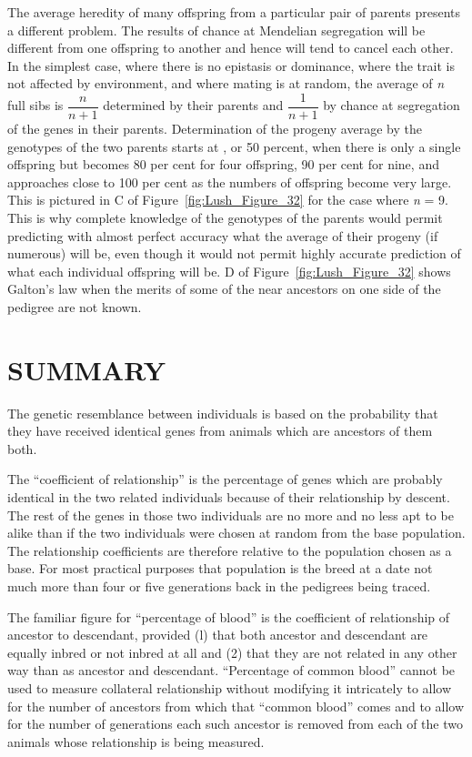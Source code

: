{
The average heredity of many offspring from a particular pair of
parents presents a different problem. The results of chance at Mendelian
segregation will be different from one offspring to another and
hence will tend to cancel each other. In the simplest case, where there
is no epistasis or dominance, where the trait is not affected by environment,
and where mating is at random, the average of \textit{n} full sibs is
$\dfrac{n}{n + 1}$ determined by their parents and $\dfrac{1}{n + 1}$ by chance at
segregation of the genes in their parents. Determination of the progeny average
by the genotypes of the two parents starts at , or 50 percent, when
there is only a single offspring but becomes 80 per cent for four offspring,
90 per cent for nine, and approaches close to 100 per cent as the
numbers of offspring become very large. This is pictured in C of
Figure~\ref{fig:Lush_Figure_32} for the case where \textit{n} = 9. This is why complete knowledge of 
the genotypes of the parents would permit predicting with almost perfect
accuracy what the average of their progeny (if numerous) will be, even
though it would not permit highly accurate prediction of what each
individual offspring will be. D of Figure~\ref{fig:Lush_Figure_32} shows Galton's law when
the merits of some of the near ancestors on one side of the pedigree are
not known.

\section*{SUMMARY}

The genetic resemblance between individuals is based on the probability
that they have received identical genes from animals which are
ancestors of them both.

The ``coefficient of relationship''	 is the percentage of genes which
are probably identical in the two related individuals because of their
relationship by descent. The rest of the genes in those two individuals
are no more and no less apt to be alike than if the two individuals were
chosen at random from the base population. The relationship coefficients
are therefore relative to the population chosen as a base. For most
practical purposes that population is the breed at a date not much
more than four or five generations back in the pedigrees being traced.

The familiar figure for ``percentage of blood'' is the coefficient of
relationship of ancestor to descendant, provided (l) that both ancestor
and descendant are equally inbred or not inbred at all and (2) that they
are not related in any other way than as ancestor and descendant. ``Percentage
of common blood'' cannot be used to measure collateral relationship
without modifying it intricately to allow for the number of
ancestors from which that ``common blood'' comes and to allow for the
number of generations each such ancestor is removed from each of the
two animals whose relationship is being measured.

}
